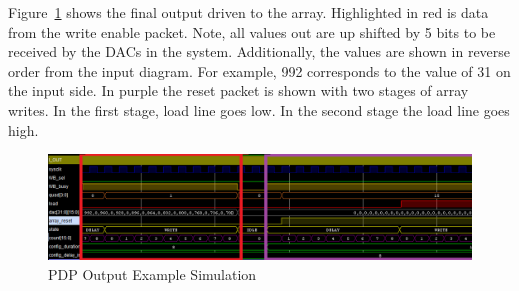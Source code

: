 Figure~\ref{fig:output_example} shows the final output driven to the array. Highlighted in red is data from the write enable packet. Note, all values out are up shifted by 5 bits to be received by the DACs in the system. Additionally, the values are shown in reverse order from the input diagram. For example, 992 corresponds to the value of 31 on the input side. In purple the reset packet is shown with two stages of array writes. In the first stage, load line goes low. In the second stage the load line goes high.

\begin{figure}
    \centering
    \includegraphics[width=1.0\textwidth]{fig/pdp_output_example.png}
    \caption{PDP Output Example Simulation}
    \label{fig:output_example}
\end{figure}
